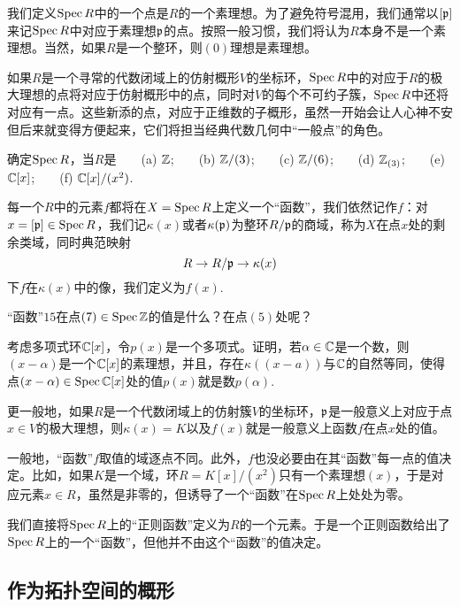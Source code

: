 我们定义$\operatorname{Spec} R$中的一个点是$R$的一个素理想。为了避免符号混用，我们通常以$[\mathfrak{p}]$来记$\operatorname{Spec} R$中对应于素理想$\mathfrak{p}$的点。按照一般习惯，我们将认为$R$本身不是一个素理想。当然，如果$R$是一个整环，则$(0)$理想是素理想。

如果$R$是一个寻常的代数闭域上的仿射概形$V$的坐标环，$\operatorname{Spec} R$中的对应于$R$的极大理想的点将对应于仿射概形中的点，同时对$V$的每个不可约子簇，$\operatorname{Spec} R$中还将对应有一点。这些新添的点，对应于正维数的子概形，虽然一开始会让人心神不安但后来就变得方便起来，它们将担当经典代数几何中“一般点”的角色。

\begin{exe}
确定$\operatorname{Spec} R$，当$R$是~~~~(a) $\mathbb{Z}$;~~~~(b) $\mathbb{Z}/(3)$;~~~~(c) $\mathbb{Z}/(6)$;~~~~(d) $\mathbb{Z}_{(3)}$;~~~~(e) $\mathbb{C}[x]$;~~~~(f) $\mathbb{C}[x]/(x^2)$.
\end{exe}

每一个$R$中的元素$f$都将在$X=\operatorname{Spec} R$上定义一个“函数”，我们依然记作$f$：对$x=[\mathfrak{p}]\in \operatorname{Spec} R$，我们记$\kappa(x)$或者$\kappa(\mathfrak{p})$为整环$R/\mathfrak{p}$的商域，称为$X$在点$x$处的剩余类域，同时典范映射
\[
	R\to R/\mathfrak{p}\to \kappa(x)
\]
下$f$在$\kappa(x)$中的像，我们定义为$f(x)$.

\begin{exe}
	“函数”$15$在点$(7)\in \operatorname{Spec} \mathbb{Z}$的值是什么？在点$(5)$处呢？
\end{exe}

\begin{exe}
	\begin{compactenum}[{(a)}]
		\item 考虑多项式环$\mathbb{C}[x]$，令$p(x)$是一个多项式。证明，若$\alpha\in\mathbb{C}$是一个数，则$(x-\alpha)$是一个$\mathbb{C}[x]$的素理想，并且，存在$\kappa((x-a))$与$\mathbb{C}$的自然等同，使得点$(x-\alpha)\in\operatorname{Spec}\mathbb{C}[x]$处的值$p(x)$就是数$p(\alpha)$.
		\item 更一般地，如果$R$是一个代数闭域上的仿射簇$V$的坐标环，$\mathfrak{p}$是一般意义上对应于点$x\in V$的极大理想，则$\kappa(x)=K$以及$f(x)$就是一般意义上函数$f$在点$x$处的值。
	\end{compactenum}
\end{exe}

一般地，“函数”$f$取值的域逐点不同。此外，$f$也没必要由在其“函数”每一点的值决定。比如，如果$K$是一个域，环$R=K[x]/(x^2)$只有一个素理想$(x)$，于是对应元素$x\in R$，虽然是非零的，但诱导了一个“函数”在$\operatorname{Spec} R$上处处为零。

我们直接将$\operatorname{Spec} R$上的“正则函数”定义为$R$的一个元素。于是一个正则函数给出了$\operatorname{Spec} R$上的一个“函数”，但他并不由这个“函数”的值决定。

\subsection{作为拓扑空间的概形}


